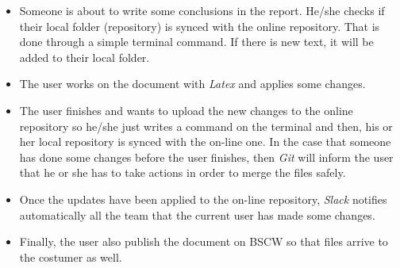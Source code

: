 \begin{itemize}
\item Someone is about to write some conclusions in the report. He/she checks if their local folder (repository) is synced  with the online repository. That is done through a simple terminal command. If there is new text, it will be added to their local folder.
\item The user works on the document with \textit{Latex} and applies some changes.
\item The user finishes and wants to upload the new changes to the online repository so he/she just writes a command on the terminal and then, his or her local repository is synced with the on-line one. In the case that someone has done some changes before the user finishes, then  \textit{Git} will inform the user that he or she has to take actions in order to merge the files safely.
\item Once the updates have been applied to the on-line repository, \textit{Slack} notifies automatically all the team that the current user has made some changes.
\item Finally, the user also publish the document on BSCW so that files arrive to the costumer as well.
\end{itemize}

